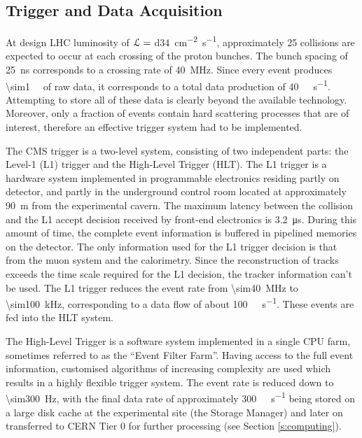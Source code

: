 \newpage
\subsection{Trigger and Data Acquisition}
\label{ss:trigger_daq}
At design LHC luminosity of $\mathcal{L} = $ \SI{d34}{\cm^{-2} s^{-1}}, approximately \num{25} collisions are expected to
occur at each crossing of the proton bunches. The bunch spacing of \SI{25}{\ns} corresponds to a crossing rate of
\SI{40}{\mega\hertz}. Since every event produces \SI{\sim1}{\mega\byte} of raw data, it corresponds to a total data
production of \SI{40}{\tera\byte\per\second}. Attempting to store all of these data is clearly beyond the available
technology. Moreover, only a fraction of events contain hard scattering processes that are of interest, therefore an
effective trigger system had to be implemented.

The CMS trigger is a two-level system, consisting of two independent parts: the Level-1 (L1) trigger and the High-Level
Trigger (HLT). The L1 trigger is a hardware system implemented in programmable electronics residing partly on detector,
and partly in the underground control room located at approximately \SI{90}{\metre} from the experimental cavern. The
maximum latency between the collision and the L1 accept decision received by front-end electronics is
\SI{3.2}{\micro\second}. During this amount of time, the complete event information is buffered in pipelined memories
on the detector. The only information used for the L1 trigger decision is that from the muon system and the calorimetry.
Since the reconstruction of tracks exceeds the time scale required for the L1 decision, the tracker information can't be
used. The L1 trigger reduces the event rate from \SI{\sim40}{\mega\hertz} to \SI{\sim100}{\kilo\hertz}, corresponding to
a data flow of about \SI{100}{\giga\byte\per\second}. These events are fed into the HLT system.

The High-Level Trigger is a software system implemented in a single CPU farm, sometimes referred to as the ``Event
Filter Farm''. Having access to the full event information, customised algorithms of increasing complexity are used
which results in a highly flexible trigger system. The event rate is reduced down to \SI{\sim300}{\Hz}, with the final
data rate of approximately \SI{300}{\mega\byte\per\second} being stored on a large disk cache at the experimental site
(the Storage Manager) and later on transferred to CERN Tier 0 for further processing (see Section \ref{s:computing}).

